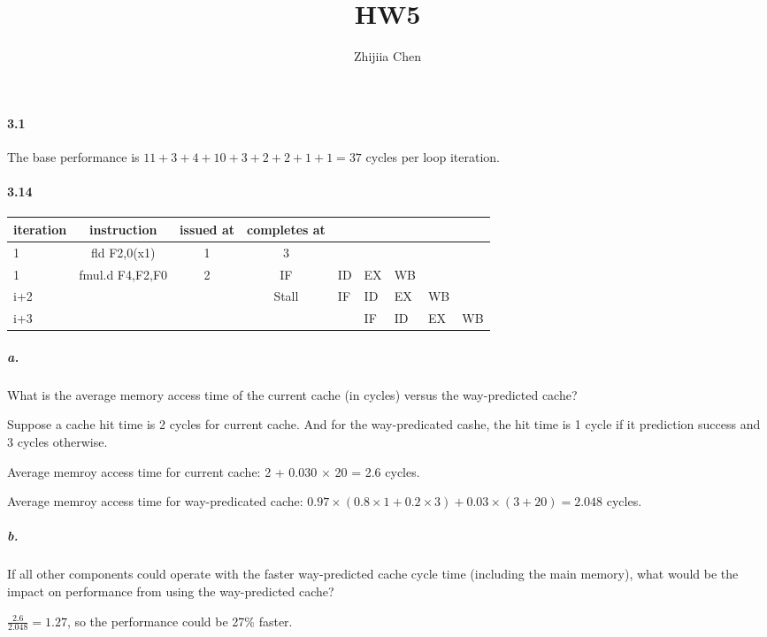 \documentclass{article}
\title{HW5}
\author{Zhijiia Chen}
\begin{document}
\maketitle

\paragraph{3.1} The base performance is $11+3+4+10+3+2+2+1+1=37$ cycles per loop iteration.

\paragraph{3.14} 

\begin{table}[ht!]
\begin{center}
\begin{tabular}{l|c|c|c} %
    \toprule
    \textbf{iteration}&\textbf{instruction}&\textbf{issued at}&\textbf{completes at}\\
    &fld F2,0(x1)&1&3\\
    &fmul.d F4,F2,F0&2&IF&ID&EX&WB&\\
    \hline
    i+2&&&Stall&IF&ID&EX&WB&\\
    \hline
    i+3&&&&&IF&ID&EX&WB\\
    \bottomrule
    \end{tabular}
\end{center}
\end{table}

\subparagraph{a.} What is the average memory access time of the current cache (in cycles) versus the way-predicted cache?

Suppose a cache hit time is 2 cycles for current cache. And for the way-predicated cashe, the hit time is 1 cycle if it prediction success and 3 cycles otherwise.

Average memroy access time for current cache: 2 + 0.030 $\times$ 20 = 2.6 cycles.

Average memroy access time for way-predicated cache: $0.97\times(0.8\times1+0.2\times3)+0.03\times(3+20)=2.048$ cycles.

\subparagraph{b.} If all other components could operate with the faster way-predicted cache cycle time (including the main memory), what would be the impact on performance from using the way-predicted cache?

$\frac{2.6}{2.048}=1.27$, so the performance could be 27\% faster.
\end{document}
